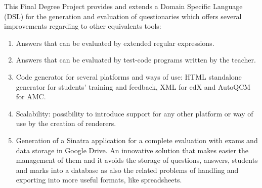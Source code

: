 
This Final Degree Project provides and extends a Domain Specific Language (DSL) for the generation and evaluation of questionaries which offers several improvements regarding to other equivalents 
tools:
\begin{enumerate}
  \item Answers that can be evaluated by extended regular expressions.
  \item Answers that can be evaluated by test-code programs written by the teacher.
  \item Code generator for several platforms and ways of use: HTML standalone generator for students' training and feedback, XML for edX\cite{edx} and AutoQCM for AMC\cite{amc}.
  \item Scalability: possibility to introduce support for any other platform or way of use by the creation of renderers.
  \item Generation of a Sinatra application for a complete evaluation with exams and data storage in Google Drive. 
An innovative solution that makes easier the management of them and it avoids 
the storage of questions, answers, students and marks into a database as also the related problems
of handling and exporting into more useful formats, like spreadsheets. 
\end{enumerate}

